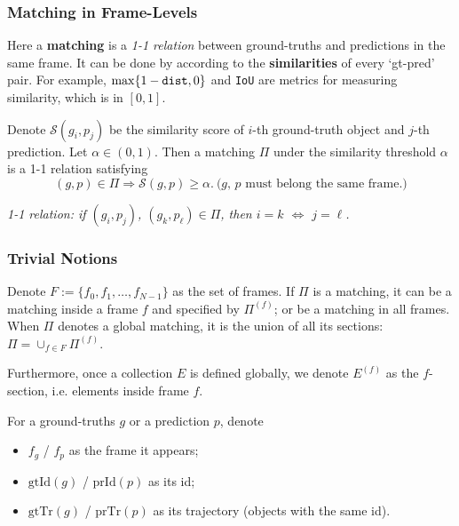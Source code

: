 \documentclass[slidestop, mathserif]{beamer}
\begin{document}
\begin{frame}
    \frametitle{Matching in Frame-Levels}

    Here a {\bf matching} is a \emph{1-1 relation} between ground-truths
    and predictions in the same frame.
    It can be done by according to the {\bf similarities} of every `gt-pred' pair.
    For example, $\max\{1-\text{\tt dist}, 0\}$ and {\tt IoU} are metrics for
    measuring similarity, which is in $[0,1]$.

    \vspace{4pt}

    Denote $\mathcal S(g_i, p_j)$ be the similarity score of $i$-th ground-truth object
    and $j$-th prediction. Let $\alpha\in(0,1)$.
    Then a matching $\Pi$ under the similarity threshold $\alpha$ is a 1-1 relation
    satisfying
    \[
        (g,p) \in \Pi \Rightarrow \mathcal S(g, p) \geq \alpha. ~ \text{($g$, $p$ must belong the same frame.)}
    \]


    \emph{1-1 relation: if $(g_i, p_j)$, $(g_k, p_\ell)\in \Pi$,
    then $i=k$ $\Leftrightarrow$ $j=\ell$.}

\end{frame}

\begin{frame}
    \frametitle{Trivial Notions}

    Denote $F:=\{f_0, f_1, \ldots, f_{N-1}\}$ as the set of frames.
    If $\Pi$ is a matching, it can be a matching inside a frame $f$ and specified by $\Pi^{(f)}$;
    or be a matching in all frames.
    When $\Pi$ denotes a global matching, it is the union of all its sections:
    $\Pi = \cup_{f\in F}\Pi^{(f)}$.

    \vspace{4pt}

    Furthermore, once a collection $E$ is defined globally,
    we denote $E^{(f)}$ as the $f$-section, i.e. elements inside frame $f$.

    \vspace{4pt}

    For a ground-truths $g$ or a prediction $p$, denote
    \begin{itemize}
    \item $f_g$ / $f_p$ as the frame it appears;
    \item $\text{gtId}(g)$ / $\text{prId}(p)$ as its id;
    \item $\text{gtTr}(g)$ / $\text{prTr}(p)$ as its trajectory (objects with the same id).
    \end{itemize}
\end{frame}
\end{document}
